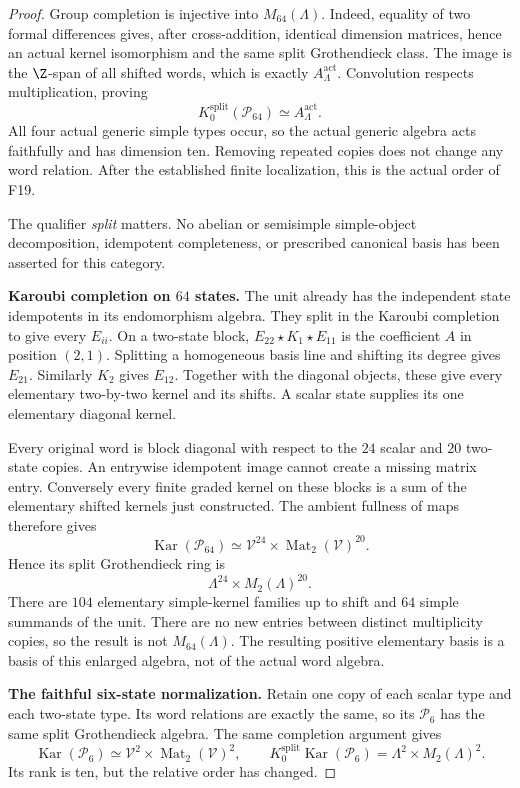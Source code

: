 \documentclass[11pt,a4paper]{article}
\newcommand{\fid}[1]{\textsf{#1}}\newcommand{\gate}[1]{\textsf{#1}}
\theoremstyle{named}\newtheorem{finding}{Finding}[section]
\theoremstyle{definition}\newtheorem{definition}[finding]{Definition}
\theoremstyle{remark}\newtheorem{remark}[finding]{Remark}
\begin{document}
\begin{proof}
Group completion is injective into $M_{64}(\Lambda)$.
Indeed, equality of two formal differences gives,
after cross-addition, identical dimension matrices,
hence an actual kernel isomorphism and the same
split Grothendieck class.
The image is the $\Z$-span of all shifted words,
which is exactly $A_\Lambda^{\mathrm{act}}$.
Convolution respects multiplication, proving
\[
 K_0^{\mathrm{split}}(\mathcal P_{64})
          \simeq A_\Lambda^{\mathrm{act}}.
\]
All four actual generic simple types occur, so the
actual generic algebra acts faithfully and has
dimension ten.
Removing repeated copies does not change any word
relation. After the established finite localization,
this is the actual order of \fid{F19}.

The qualifier \emph{split} matters.
No abelian or semisimple simple-object decomposition,
idempotent completeness, or prescribed canonical basis
has been asserted for this category.

\par\smallskip\noindent\textbf{Karoubi completion on $64$ states.}\quad
The unit already has the independent state idempotents
in its endomorphism algebra.
They split in the Karoubi completion to give every
$E_{ii}$.
On a two-state block,
$E_{22}\star K_1\star E_{11}$ is the coefficient $A$
in position $(2,1)$.
Splitting a homogeneous basis line and shifting its
degree gives $E_{21}$.
Similarly $K_2$ gives $E_{12}$.
Together with the diagonal objects, these give every
elementary two-by-two kernel and its shifts.
A scalar state supplies its one elementary diagonal kernel.

Every original word is block diagonal with respect to
the $24$ scalar and $20$ two-state copies.
An entrywise idempotent image cannot create a missing
matrix entry.
Conversely every finite graded kernel on these blocks
is a sum of the elementary shifted kernels just constructed.
The ambient fullness of maps therefore gives
\[
 \operatorname{Kar}(\mathcal P_{64})
       \simeq\mathcal V^{24}\times
                    \operatorname{Mat}_2(\mathcal V)^{20}.
\]
Hence its split Grothendieck ring is
\[
 \Lambda^{24}\times M_2(\Lambda)^{20}.
\]
There are $104$ elementary simple-kernel families
up to shift and $64$ simple summands of the unit.
There are no new entries between distinct multiplicity
copies, so the result is not $M_{64}(\Lambda)$.
The resulting positive elementary basis is a basis
of this enlarged algebra, not of the actual word algebra.

\par\smallskip\noindent\textbf{The faithful six-state normalization.}\quad
Retain one copy of each scalar type and each two-state type.
Its word relations are exactly the same, so its
$\mathcal P_6$ has the same split Grothendieck algebra.
The same completion argument gives
\[
 \operatorname{Kar}(\mathcal P_6)
   \simeq\mathcal V^2\times\operatorname{Mat}_2(\mathcal V)^2,
 \qquad
 K_0^{\mathrm{split}}\operatorname{Kar}(\mathcal P_6)
   =\Lambda^2\times M_2(\Lambda)^2.
\]
Its rank is ten, but the relative order has changed.


\end{proof}
\end{document}
